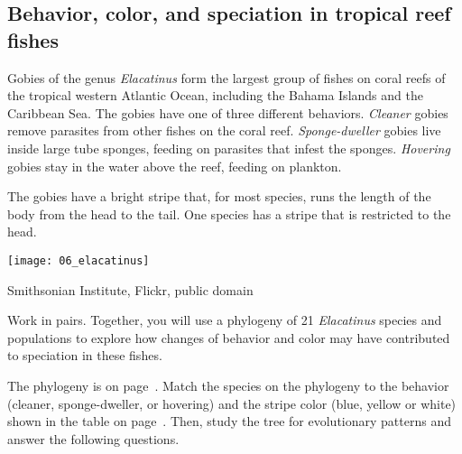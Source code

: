 \documentclass[12pt, hidelinks]{exam}
\begin{document}
\subsection*{Behavior, color, and speciation in tropical reef fishes}

Gobies of the genus \textit{Elacatinus} form the largest group of fishes on
coral reefs of the tropical western Atlantic Ocean, including the Bahama Islands
and the Caribbean Sea. The gobies have one of three different behaviors. \emph{Cleaner} gobies
remove parasites from other fishes on the coral reef. \emph{Sponge-dweller} gobies
live inside large tube sponges, feeding on parasites that infest the sponges. \emph{Hovering} gobies
stay in the water above the reef, feeding on plankton.

The gobies have a bright stripe that, for most species, runs the length of the body
from the head to the tail. One species has a stripe that is restricted to the head.

\begin{center}
	\texttt{[image: 06\_elacatinus]}

	{\footnotesize
	Smithsonian Institute, Flickr, public domain}
\end{center}

Work in pairs. Together,
you will use a phylogeny of 21 \textit{Elacatinus} species and
populations to explore how changes of behavior and color may have
contributed to speciation in these fishes.

The phylogeny is on page~\pageref{phylogeny}. Match the species on the phylogeny
to the behavior (cleaner, sponge-dweller, or hovering) and the stripe color 
(blue, yellow or white) shown in the table on page~\pageref{color_behavior}. 
Then, study the tree for evolutionary patterns and answer the following questions.
\end{document}
